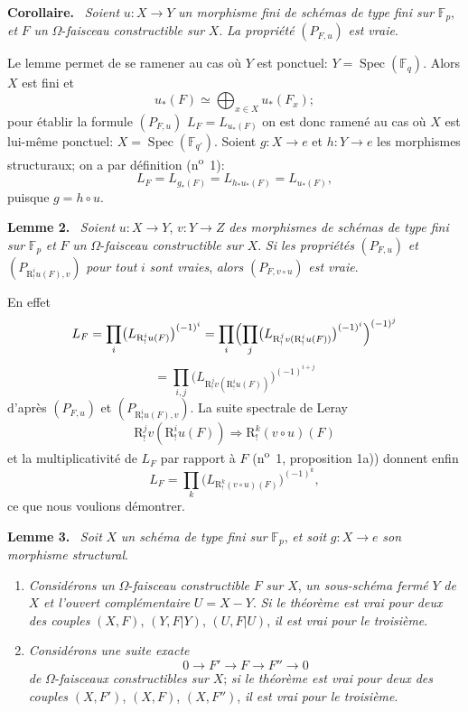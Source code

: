\documentclass[11pt]{article}
\newenvironment{statement}[1]{\par\medskip\noindent\textbf{#1.}\ }{\par\medskip}
\DeclareMathOperator{\Spec}{Spec}
\providecommand{\Spec}{\operatorname{Spec}}
\providecommand{\Spec}{\operatorname{Spec}}
\providecommand{\Spec}{\operatorname{Spec}}
\providecommand{\Spec}{\operatorname{Spec}}
\begin{document}
\begin{statement}{Corollaire}
\emph{Soient} $u:X\to Y$ \emph{un morphisme fini de schémas de type fini sur} $\mathbb F_p$, \emph{et} $F$ \emph{un} $\Omega$-\emph{faisceau constructible sur} $X$. \emph{La propriété} $(P_{F,u})$ \emph{est vraie}.
\end{statement}

Le lemme permet de se ramener au cas où $Y$ est ponctuel: $Y=\Spec(\mathbb F_q)$. Alors $X$ est fini et
\[
u_*(F)\simeq \bigoplus_{x\in X}u_*(F_x);
\]
pour établir la formule $(P_{F,u})$ $L_F=L_{u_*(F)}$ on est donc ramené au cas où $X$ est lui-même ponctuel: $X=\Spec(\mathbb F_{q'})$. Soient $g:X\to e$ et $h:Y\to e$ les morphismes structuraux; on a par définition (n\textsuperscript{o}~1):
\[
L_F=L_{g_*(F)}=L_{h_*u_*(F)}=L_{u_*(F)},
\]
puisque $g=h\circ u$.

\begin{statement}{Lemme 2}
\emph{Soient} $u:X\to Y$, $v:Y\to Z$ \emph{des morphismes de schémas de type fini sur} $\mathbb F_p$ \emph{et} $F$ \emph{un} $\Omega$-\emph{faisceau constructible sur} $X$. \emph{Si les propriétés} $(P_{F,u})$ \emph{et} $(P_{\mathrm{R}^i_!u(F),v})$ \emph{pour tout} $i$ \emph{sont vraies}, \emph{alors} $(P_{F,v\circ u})$ \emph{est vraie}.
\end{statement}

En effet
\[
L_F=\prod_i\bigl(L_{\mathrm{R}^i_!u(F)}\bigr)^{(-1)^i}
 =\prod_i\Bigl(\prod_j\bigl(L_{\mathrm{R}^j_!v(\mathrm{R}^i_!u(F))}\bigr)^{(-1)^i}\Bigr)^{(-1)^j}
\]
\[
=\prod_{i,j}\bigl(L_{\mathrm{R}^j_!v(\mathrm{R}^i_!u(F))}\bigr)^{(-1)^{i+j}}
\]
d'après $(P_{F,u})$ et $(P_{\mathrm{R}^i_!u(F),v})$. La suite spectrale de Leray
\[
\mathrm{R}^j_!v(\mathrm{R}^i_!u(F))\Longrightarrow \mathrm{R}^k_!(v\circ u)(F)
\]
et la multiplicativité de $L_F$ par
rapport à $F$ (n\textsuperscript{o}~1, proposition 1a)) donnent enfin
\[
L_F=\prod_k\bigl(L_{\mathrm{R}^k_!(v\circ u)(F)}\bigr)^{(-1)^k},
\]
ce que nous voulions démontrer.

\begin{statement}{Lemme 3}
\emph{Soit} $X$ \emph{un schéma de type fini sur} $\mathbb F_p$, \emph{et soit} $g:X\to e$ \emph{son morphisme structural}.
\begin{enumerate}[label=\alph*)]
\item \emph{Considérons un} $\Omega$-\emph{faisceau constructible} $F$ \emph{sur} $X$, \emph{un sous-schéma fermé} $Y$ \emph{de} $X$ \emph{et l'ouvert complémentaire} $U=X-Y$. \emph{Si le théorème est vrai pour deux des couples} $(X,F)$, $(Y,F|Y)$, $(U,F|U)$, \emph{il est vrai pour le troisième}.
\item \emph{Considérons une suite exacte}
\[
0\longrightarrow F'\longrightarrow F\longrightarrow F''\longrightarrow0
\]
\emph{de} $\Omega$-\emph{faisceaux constructibles sur} $X$; \emph{si le théorème est vrai pour deux des couples} $(X,F')$, $(X,F)$, $(X,F'')$, \emph{il est vrai pour le troisième}.
\end{enumerate}
\end{statement}
\end{document}
